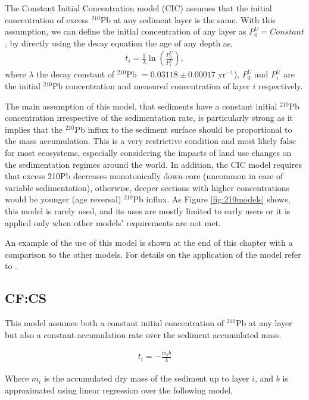 \documentclass [10pt] {article}
\begin{document}
The Constant Initial Concentration model (CIC) \citep{Goldberg1963,Crozaz1964,Robbins1978} assumes that the initial concentration of excess $^{210}$Pb at any sediment layer is the same. 
With this assumption, we can define the initial concentration of any layer as $P_0^U = Constant$, by directly using the decay equation the age of any depth as,
\begin{eqnarray}
	t_i = \frac{1}{\lambda}\ln \left( \frac{P_0^U}{P_i^U}\right),
\end{eqnarray}
where $\lambda$ the decay constant of $^{210}$Pb $= 0.03118\pm 0.00017$ yr$^{-1}$), $P_0^U$ and $P_i^U$ are the initial $^{210}$Pb concentration and measured concentration of layer $i$ respectively. 

The main assumption of this model, that sediments have a constant initial $^{210}$Pb concentration irrespective of the sedimentation rate, is particularly strong as it implies that the $^{210}$Pb influx to the sediment surface should be proportional to the mass accumulation. 
This is a very restrictive condition and most likely false for most ecosystems, especially considering the impacts of land use changes on the sedimentation regimes around the world. 
In addition, the CIC model requires that excess 210Pb decreases monotonically down-core (uncommon in case of variable sedimentation), otherwise, deeper sections with higher concentrations would be younger (age reversal) $^{210}$Pb influx.
As Figure \ref{fig:210models} shows, this model is rarely used, and its uses are mostly limited to early users or it is applied only when other models' requirements are not met.

An example of the use of this model is shown at the end of this chapter with a comparison to the other models. For details on the application of the model refer to \citet{Sanchez-Cabeza2012}.


\subsection{CF:CS}

This model assumes both a constant initial concentration of $^{210}$Pb at any layer but also a constant accumulation rate over the sediment accumulated mass.  

\begin{eqnarray}
	t_i = -\frac{m_i b}{\lambda}
\end{eqnarray}

Where $m_i$ is the accumulated dry mass of the sediment up to layer $i$, and $b$ is approximated using linear regression over the following model,
\end{document}
